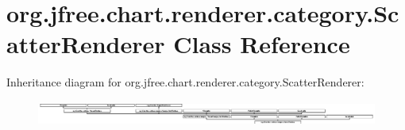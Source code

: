 \hypertarget{classorg_1_1jfree_1_1chart_1_1renderer_1_1category_1_1_scatter_renderer}{}\section{org.\+jfree.\+chart.\+renderer.\+category.\+Scatter\+Renderer Class Reference}
\label{classorg_1_1jfree_1_1chart_1_1renderer_1_1category_1_1_scatter_renderer}
Inheritance diagram for org.\+jfree.\+chart.\+renderer.\+category.\+Scatter\+Renderer\+:\begin{figure}[H]
\begin{center}
\leavevmode
\includegraphics[height=0.824742cm]{classorg_1_1jfree_1_1chart_1_1renderer_1_1category_1_1_scatter_renderer}
\end{center}
\end{figure}

